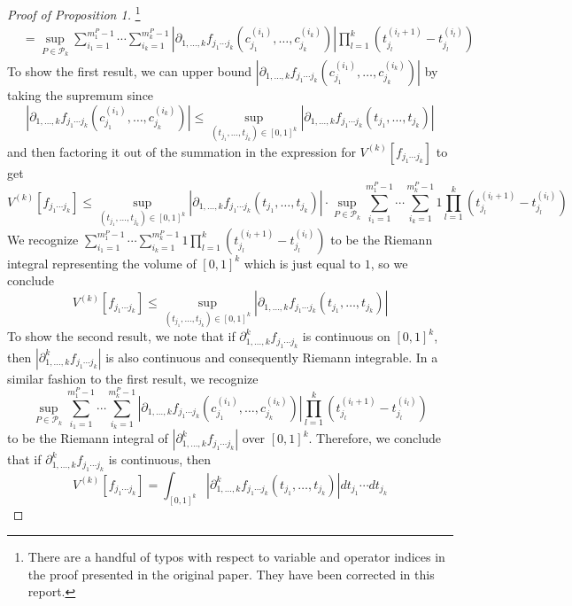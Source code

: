 \documentclass{article}
\begin{document}
\begin{proof}[Proof of Proposition 1]{\color{red}\footnote{There are a handful of typos with respect to variable and operator indices in the proof presented in the original paper. They have been corrected in this report.}}
\begin{align*}
        & = \sup_{P \in \mathcal{P}_k} \sum_{i_1 = 1}^{m^{P}_{1} - 1} \cdots \sum_{i_k = 1}^{m^{P}_{k} - 1} \left|\partial_{1, \ldots, k} f_{j_1 \cdots j_k} (c^{(i_1)}_{j_1}, \ldots, c^{(i_k)}_{j_k}) \right| \prod_{l=1}^{k} (t^{(i_l + 1)}_{j_l} - t^{(i_l)}_{j_l})
    \end{align*}
    To show the first result, we can upper bound $\left|\partial_{1, \ldots, k} f_{j_1 \cdots j_k} (c^{(i_1)}_{j_1}, \ldots, c^{(i_k)}_{j_k}) \right|$ by taking the supremum since
    \[\left|\partial_{1, \ldots, k} f_{j_1 \cdots j_k} (c^{(i_1)}_{j_1}, \ldots, c^{(i_k)}_{j_k}) \right| \leq \sup_{(t_{j_1}, \ldots, t_{j_k}) \in [0, 1]^k} \left|\partial_{1, \ldots, k} f_{j_1 \cdots j_k} (t_{j_1}, \ldots, t_{j_k}) \right|\]
    and then factoring it out of the summation in the expression for $V^{(k)} [f_{j_1 \cdots j_k}]$ to get
    \[V^{(k)} [f_{j_1 \cdots j_k}] \leq \sup_{(t_{j_1}, \ldots, t_{j_k}) \in [0, 1]^k} \left|\partial_{1, \ldots, k} f_{j_1 \cdots j_k} (t_{j_1}, \ldots, t_{j_k}) \right| \cdot \sup_{P \in \mathcal{P}_k} \sum_{i_1 = 1}^{m^{P}_{1} - 1} \cdots \sum_{i_k = 1}^{m^{P}_{k} - 1} 1 \prod_{l=1}^{k} (t^{(i_l + 1)}_{j_l} - t^{(i_l)}_{j_l})\]
    We recognize $\sum_{i_1 = 1}^{m^{P}_{1} - 1} \cdots \sum_{i_k = 1}^{m^{P}_{k} - 1} 1 \prod_{l=1}^{k} (t^{(i_l + 1)}_{j_l} - t^{(i_l)}_{j_l})$ to be the Riemann integral representing the volume of $[0, 1]^k$ which is just equal to $1$, so we conclude
    \[V^{(k)} [f_{j_1 \cdots j_k}] \leq \sup_{(t_{j_1}, \ldots, t_{j_k}) \in [0, 1]^k} \left|\partial_{1, \ldots, k} f_{j_1 \cdots j_k} (t_{j_1}, \ldots, t_{j_k}) \right|\]
    To show the second result, we note that if $\partial^{k}_{1, \ldots, k} f_{j_1 \cdots j_k}$ is continuous on $[0, 1]^k$, then $\left| \partial^{k}_{1, \ldots, k} f_{j_1 \cdots j_k} \right|$ is also continuous and consequently Riemann integrable. In a similar fashion to the first result, we recognize
    \[\sup_{P \in \mathcal{P}_k} \sum_{i_1 = 1}^{m^{P}_{1} - 1} \cdots \sum_{i_k = 1}^{m^{P}_{k} - 1} \left|\partial_{1, \ldots, k} f_{j_1 \cdots j_k} (c^{(i_1)}_{j_1}, \ldots, c^{(i_k)}_{j_k}) \right| \prod_{l=1}^{k} (t^{(i_l + 1)}_{j_l} - t^{(i_l)}_{j_l})\]
    to be the Riemann integral of $\left| \partial^{k}_{1, \ldots, k} f_{j_1 \cdots j_k} \right|$ over $[0, 1]^k$. Therefore, we conclude that if $\partial^{k}_{1, \ldots, k} f_{j_1 \cdots j_k} $ is continuous, then
    \[V^{(k)} [f_{j_1 \cdots j_k}] = \int_{[0, 1]^k} \left|\partial^{k}_{1, \ldots, k} f_{j_1 \cdots j_k} (t_{j_1}, \ldots, t_{j_k}) \right| dt_{j_1} \cdots dt_{j_k}\]
\end{proof}
\end{document}
